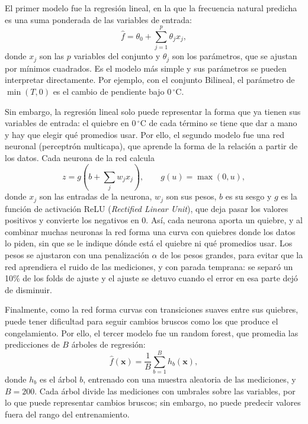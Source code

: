 \documentclass[9pt,twocolumn,twoside]{opticajnl}
\begin{document}
El primer modelo fue la regresión lineal, en la que la frecuencia natural predicha es una suma ponderada de las variables de entrada:
\begin{equation}
\hat{f} = \theta_0 + \sum_{j=1}^{p} \theta_j x_j,
\label{eq:linear}
\end{equation}
donde $x_j$ son las $p$ variables del conjunto y $\theta_j$ son los parámetros, que se ajustan por mínimos cuadrados. Es el modelo más simple y sus parámetros se pueden interpretar directamente. Por ejemplo, con el conjunto Bilineal, el parámetro de $\min(T,0)$ es el cambio de pendiente bajo $0\,^\circ$C.

Sin embargo, la regresión lineal solo puede representar la forma que ya tienen sus variables de entrada: el quiebre en $0\,^\circ$C de cada término se tiene que dar a mano y hay que elegir qué promedios usar. Por ello, el segundo modelo fue una red neuronal (perceptrón multicapa), que aprende la forma de la relación a partir de los datos. Cada neurona de la red calcula
\begin{equation}
z = g\left(b + \sum_{j} w_j x_j\right), \qquad g(u) = \max(0, u),
\label{eq:neuron}
\end{equation}
donde $x_j$ son las entradas de la neurona, $w_j$ son sus pesos, $b$ es su sesgo y $g$ es la función de activación ReLU (\emph{Rectified Linear Unit}), que deja pasar los valores positivos y convierte los negativos en 0. Así, cada neurona aporta un quiebre, y al combinar muchas neuronas la red forma una curva con quiebres donde los datos lo piden, sin que se le indique dónde está el quiebre ni qué promedios usar. Los pesos se ajustaron con una penalización $\alpha$ de los pesos grandes, para evitar que la red aprendiera el ruido de las mediciones, y con parada temprana: se separó un 10\% de los folds de ajuste y el ajuste se detuvo cuando el error en esa parte dejó de disminuir.

Finalmente, como la red forma curvas con transiciones suaves entre sus quiebres, puede tener dificultad para seguir cambios bruscos como los que produce el congelamiento. Por ello, el tercer modelo fue un random forest, que promedia las predicciones de $B$ árboles de regresión:
\begin{equation}
\hat{f}(\mathbf{x}) = \frac{1}{B} \sum_{b=1}^{B} h_b(\mathbf{x}),
\label{eq:random-forest}
\end{equation}
donde $h_b$ es el árbol $b$, entrenado con una muestra aleatoria de las mediciones, y $B = 200$. Cada árbol divide las mediciones con umbrales sobre las variables, por lo que puede representar cambios bruscos; sin embargo, no puede predecir valores fuera del rango del entrenamiento.
\end{document}
